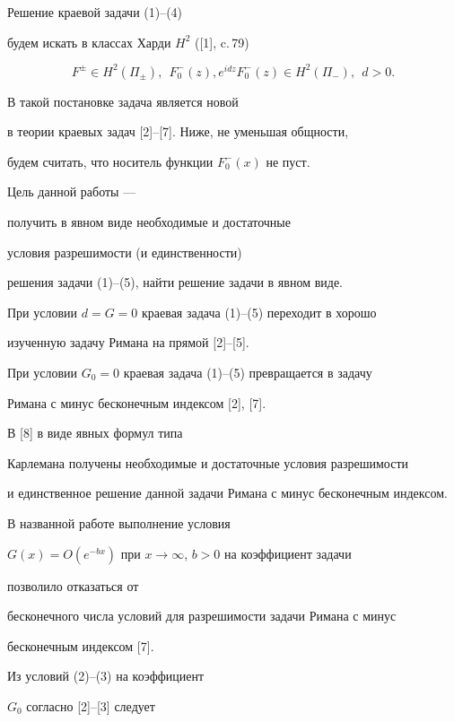 Решение краевой задачи (1)--(4)


будем искать в классах Харди $H^2$ ([1], c.\,79)


\begin{equation}


F^\pm\in H^2(\Pi_\pm),\ \ F_0^-(z), e^{idz}F_0^-(z)\in


H^2(\Pi_-),\ \ d>0.


\end{equation}


В такой постановке задача является новой


в теории краевых задач [2]--[7]. Ниже, не уменьшая общности, 


будем считать, что носитель функции $F_0^-(x)$ не пуст. 





Цель данной работы ---


получить в явном виде необходимые и достаточные


условия разрешимости (и единственности)


решения задачи (1)--(5), найти решение задачи в явном виде.





При условии $d=G=0$ краевая задача (1)--(5) переходит в хорошо


изученную задачу Римана на прямой [2]--[5].


При условии $G_0=0$ краевая задача (1)--(5) превращается в задачу


Римана с минус бесконечным индексом [2], [7].


В [8] в виде явных формул типа


Карлемана получены необходимые и достаточные условия разрешимости


и единственное решение данной задачи Римана с минус бесконечным индексом.


В названной работе выполнение условия 


$G(x)=O(e^{-bx})$ при $x\to \infty$, $b>0$ на коэффициент задачи


позволило отказаться от 


бесконечного числа условий для разрешимости задачи Римана с минус


бесконечным индексом [7].





Из условий (2)--(3) на коэффициент


$G_0$ согласно [2]--[3] следует



